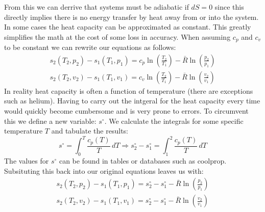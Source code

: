 \documentclass[11pt, a4paper]{article}
\begin{document}
From this we can derrive that systems must be adiabatic if $dS = 0$ since this directly implies there is no energy transfer by heat away from or into the system. In some cases the heat capacity can be approximated as constant. This greatly simplifies the math at the cost of some loss in accuracy. When assuming $c_p$ and $c_v$ to be constant we can rewrite our equations as follows:
\begin{gather}
  s_2(T_2, p_2) - s_1(T_1, p_1) = c_p\ln\left( \frac{T_2}{T_1} \right) - \bar{R}\ln\left( \frac{p_2}{p_1} \right)\\
  s_2(T_2, v_2) - s_1(T_1, v_1) = c_v\ln\left( \frac{T_2}{T_1} \right) - \bar{R}\ln\left( \frac{v_2}{v_1} \right)
\end{gather}
In reality heat capacity is often a function of temperature (there are exceptions such as helium). Having to carry out the intgeral for the heat capacity every time would quickly become cumbersome and is very prone to errors. To circumvent this we define a new variable: $s^\circ$. We calculate the integrals for some specific temperature $T$ and tabulate the results:
\begin{equation}
  s^\circ = \int_0^T \frac{c_p(T)}{T}\,dT \Rightarrow s_2^\circ - s_1^\circ = \int_1^2 \frac{c_p(T)}{T}\,dT
\end{equation}
The values for $s^\circ$ can be found in tables or databases such as coolprop. Subsituting this back into our original equations leaves us with:
\begin{gather}
  s_2(T_2, p_2) - s_1(T_1, p_1) = s_2^\circ - s_1^\circ - \bar{R}\ln\left(\frac{p_2}{p_1} \right)\\
  s_2(T_2, v_2) - s_1(T_1, v_1) = s_2^\circ - s_1^\circ - \bar{R}\ln\left(\frac{v_2}{v_1} \right)\\
\end{gather}
\end{document}
